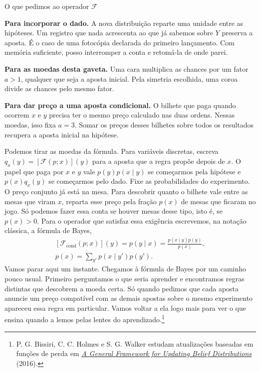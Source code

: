 \documentclass[12pt,oneside]{article}
\newcommand{\itemq}[1]{\par\textbf{#1.}\enspace}
\newcommand{\bookanchor}[1]{\phantomsection\label{#1}}
\begin{document}
\begin{quadro}{O que pedimos ao operador \(\mathcal F\)}
\itemq{Para incorporar o dado} A nova distribuição reparte uma unidade entre as hipóteses. Um registro que nada acrescenta ao que já sabemos sobre $Y$ preserva a aposta. É o caso de uma fotocópia declarada do primeiro lançamento. Com memória suficiente, posso interromper a conta e retomá-la de onde parei.
\itemq{Para as moedas desta gaveta} Uma cara multiplica as chances por um fator $a>1$, qualquer que seja a aposta inicial. Pela simetria escolhida, uma coroa divide as chances pelo mesmo fator.
\itemq{Para dar preço a uma aposta condicional} O bilhete que paga quando ocorrem $x$ e $y$ precisa ter o mesmo preço calculado nas duas ordens. Nessas moedas, isso fixa $a=3$. Somar os preços desses bilhetes sobre todos os resultados recupera a aposta inicial na hipótese.
\end{quadro}

Podemos\bookanchor{topic-01-3} tirar as moedas da fórmula. Para variáveis discretas, escreva $q_x(y)=[\mathcal F(p;x)](y)$ para a aposta que a regra propõe depois de $x$. O papel que paga por $x$ e $y$ vale $p(y)p(x\mid y)$ se começarmos pela hipótese e $p(x)q_x(y)$ se começarmos pelo dado. Fixe as probabilidades do experimento. O preço conjunto já está na mesa. Para descobrir quanto o bilhete vale entre as mesas que viram $x$, reparta esse preço pela fração $p(x)$ de mesas que ficaram no jogo. Só podemos fazer essa conta se houver mesas desse tipo, isto é, se $p(x)>0$. Para o operador que satisfaz essa exigência escrevemos, na notação clássica, a fórmula de Bayes,
\[
 \begin{gathered}
 [\mathcal F_{\mathrm{cond}}(p;x)](y)=p(y\mid x)
 =\frac{p(x\mid y)p(y)}{p(x)},\\[4pt]
 p(x)=\sum_{y'}p(x\mid y')p(y').
 \end{gathered}
\]
Vamos parar aqui um instante. Chegamos à fórmula de Bayes por um caminho pouco usual. Primeiro perguntamos o que seria aprender e encontramos regras distintas que descobrem a moeda certa. Só quando pedimos que cada aposta anuncie um preço compatível com as demais apostas sobre o mesmo experimento apareceu essa regra em particular. Vamos voltar a ela logo mais para ver o que ensina quando a lemos pelas lentes do aprendizado.\footnote{P. G. Bissiri, C. C. Holmes e S. G. Walker estudam atualizações baseadas em funções de perda em \href{https://doi.org/10.1111/rssb.12158}{\emph{A General Framework for Updating Belief Distributions}} (2016).}
\end{document}
